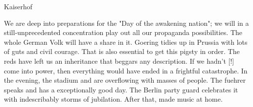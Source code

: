 Kaiserhof

We are deep into preparations for the "Day of the awakening nation"; we will in a still-unprecedented concentration play out all our propaganda possibilities. The whole German Volk will have a share in it. Goering tidies up in Prussia with lots of guts and civil courage. That is also essential to get this pigsty in order. The reds have left us an inheritance that beggars any description. If we hadn't [!] come into power, then everything would have ended in a frightful catastrophe. In the evening, the stadium and  are overflowing with masses of people. The fuehrer speaks and has a exceptionally good day. The Berlin party guard celebrates it with indescribably storms of jubilation. After that, made music at home.
